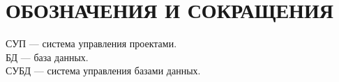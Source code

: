 \section*{ОБОЗНАЧЕНИЯ И СОКРАЩЕНИЯ}

\noindent СУП --- система управления проектами. \\
БД --- база данных. \\
СУБД --- система управления базами данных. \\
\clearpage